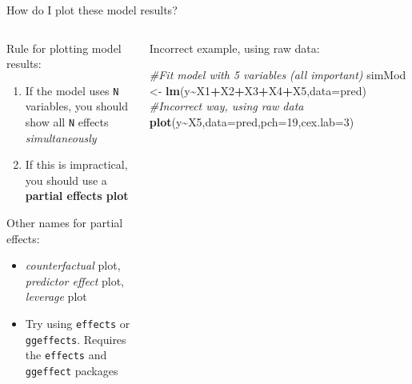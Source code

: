 \documentclass[
  ignorenonframetext,
  aspectratio=169]{beamer}
\newenvironment{Shaded}{\begin{snugshade}}{\end{snugshade}}
\newcommand{\AttributeTok}[1]{\textcolor[rgb]{0.13,0.29,0.53}{#1}}
\newcommand{\CommentTok}[1]{\textcolor[rgb]{0.56,0.35,0.01}{\textit{#1}}}
\newcommand{\DecValTok}[1]{\textcolor[rgb]{0.00,0.00,0.81}{#1}}
\newcommand{\FunctionTok}[1]{\textcolor[rgb]{0.13,0.29,0.53}{\textbf{#1}}}
\newcommand{\NormalTok}[1]{#1}
\newcommand{\OtherTok}[1]{\textcolor[rgb]{0.56,0.35,0.01}{#1}}
\newcommand{\SpecialCharTok}[1]{\textcolor[rgb]{0.81,0.36,0.00}{\textbf{#1}}}
\providecommand{\tightlist}{%
  \setlength{\itemsep}{0pt}\setlength{\parskip}{0pt}}
\let\oldShaded\Shaded %
\let\endoldShaded\endShaded
\renewenvironment{Shaded}{\scriptsize\oldShaded}{\endoldShaded}
\begin{document}
\begin{frame}[fragile]{How do I plot these model results?}
\protect\hypertarget{how-do-i-plot-these-model-results}{}
\begin{columns}[T]
\begin{column}{0.48\textwidth}
Rule for plotting model results:

\begin{enumerate}[<+->]
\tightlist
\item
  If the model uses \texttt{N} variables, you should show all \texttt{N}
  effects \emph{simultaneously}
\item
  If this is impractical, you should use a \textbf{partial effects plot}
\end{enumerate}

Other names for partial effects:

\begin{itemize}[<+->]
\tightlist
\item
  \emph{counterfactual} plot, \emph{predictor effect} plot,
  \emph{leverage} plot
\item
  Try using \texttt{effects} or \texttt{ggeffects}. Requires the
  \texttt{effects} and \texttt{ggeffect} packages
\end{itemize}
\end{column}

\begin{column}{0.48\textwidth}
Incorrect example, using raw data: \tiny

\begin{Shaded}
\begin{Highlighting}[]
\CommentTok{\#Fit model with 5 variables (all important)}
\NormalTok{simMod }\OtherTok{\textless{}{-}} \FunctionTok{lm}\NormalTok{(y}\SpecialCharTok{\textasciitilde{}}\NormalTok{X1}\SpecialCharTok{+}\NormalTok{X2}\SpecialCharTok{+}\NormalTok{X3}\SpecialCharTok{+}\NormalTok{X4}\SpecialCharTok{+}\NormalTok{X5,}\AttributeTok{data=}\NormalTok{pred) }
\CommentTok{\#Incorrect way, using raw data }
\FunctionTok{plot}\NormalTok{(y}\SpecialCharTok{\textasciitilde{}}\NormalTok{X5,}\AttributeTok{data=}\NormalTok{pred,}\AttributeTok{pch=}\DecValTok{19}\NormalTok{,}\AttributeTok{cex.lab=}\DecValTok{3}\NormalTok{) }
\end{Highlighting}
\end{Shaded}


\end{column}
\end{columns}
\end{frame}
\end{document}
